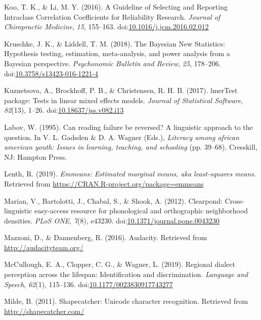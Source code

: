 \documentclass[doc,floatsintext]{apa6}
\begin{document}
\hypertarget{ref-Koo2016}{}
Koo, T. K., \& Li, M. Y. (2016). A Guideline of Selecting and Reporting
Intraclass Correlation Coefficients for Reliability Research.
\emph{Journal of Chiropractic Medicine}, \emph{15}, 155--163.
doi:\href{https://doi.org/10.1016/j.jcm.2016.02.012}{10.1016/j.jcm.2016.02.012}

\hypertarget{ref-Kruschke2018}{}
Kruschke, J. K., \& Liddell, T. M. (2018). The Bayesian New Statistics:
Hypothesis testing, estimation, meta-analysis, and power analysis from a
Bayesian perspective. \emph{Psychonomic Bulletin and Review}, \emph{25},
178--206.
doi:\href{https://doi.org/10.3758/s13423-016-1221-4}{10.3758/s13423-016-1221-4}

\hypertarget{ref-R-lmerTest}{}
Kuznetsova, A., Brockhoff, P. B., \& Christensen, R. H. B. (2017).
lmerTest package: Tests in linear mixed effects models. \emph{Journal of
Statistical Software}, \emph{82}(13), 1--26.
doi:\href{https://doi.org/10.18637/jss.v082.i13}{10.18637/jss.v082.i13}

\hypertarget{ref-Labov1995}{}
Labov, W. (1995). Can reading failure be reversed? A linguistic approach
to the question. In V. L. Gadsden \& D. A. Wagner (Eds.), \emph{Literacy
among african american youth: Issues in learning, teaching, and
schooling} (pp. 39--68). Cresskill, NJ: Hampton Press.

\hypertarget{ref-R-emmeans}{}
Lenth, R. (2019). \emph{Emmeans: Estimated marginal means, aka
least-squares means}. Retrieved from
\url{https://CRAN.R-project.org/package=emmeans}

\hypertarget{ref-Marian2012}{}
Marian, V., Bartolotti, J., Chabal, S., \& Shook, A. (2012). Clearpond:
Cross-linguistic easy-access resource for phonological and orthographic
neighborhood densities. \emph{PLoS ONE}, \emph{7}(8), e43230.
doi:\href{https://doi.org/10.1371/journal.pone.0043230}{10.1371/journal.pone.0043230}

\hypertarget{ref-Mazzoni2016}{}
Mazzoni, D., \& Dannenberg, R. (2016). Audacity. Retrieved from
\url{http://audacityteam.org/}

\hypertarget{ref-McCullough2019}{}
McCullough, E. A., Clopper, C. G., \& Wagner, L. (2019). Regional
dialect perception across the lifespan: Identification and
discrimination. \emph{Language and Speech}, \emph{62}(1), 115--136.
doi:\href{https://doi.org/10.1177/0023830917743277}{10.1177/0023830917743277}

\hypertarget{ref-Milde2011}{}
Milde, B. (2011). Shapecatcher: Unicode character recognition. Retrieved
from \url{http://shapecatcher.com/}
\end{document}

